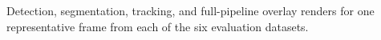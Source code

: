 \caption{Detection, segmentation, tracking, and full-pipeline overlay renders for one representative frame from each of the six evaluation datasets.}\label{fig:pipeline-overview}
